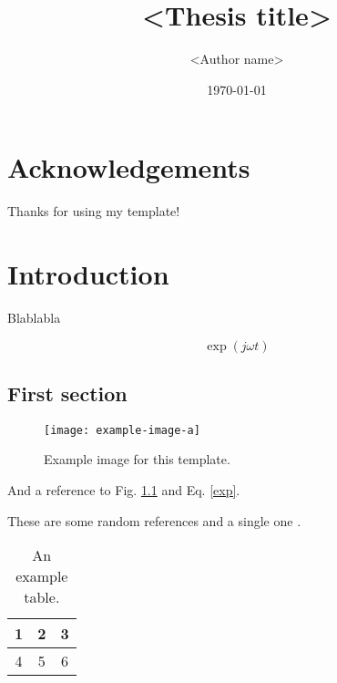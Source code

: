 \documentclass[minted]{cpa-thesis}
\title{<Thesis title>}
\author{<Author name>}
\date{\today}
\begin{document}

    \maketitle

    \chapter*{Acknowledgements}

    Thanks for using my template!

    \tableofcontents

    \listoffigures

    \listoftables
    

    \chapter{Introduction}

    Blablabla

    \blindtext[5]

    \begin{equation}
        \exp{(j \omega t)}  \label{exp} 
    \end{equation}

    \section{First section}

    \begin{figure}
        \centering
        \texttt{[image: example-image-a]}
        \caption[Example image]{Example image for this template.}
        \label{example-fig}
    \end{figure}

    \blindtext[5] And a reference to Fig. \ref{example-fig} and Eq. \ref{exp}. 

    These are some random references \cite{einstein,knuth-fa,dirac,knuthwebsite} and a single one \cite{knuth-fa}.

    \begin{table}
        \centering
        \begin{tabular}{ccc}
            \toprule
            1 & 2 & 3 \\
            \midrule
            4 & 5 & 6 \\
            \hline
        \end{tabular}
        \caption[A table]{An example table.}
        \label{example-table}
    \end{table}
\end{document}
